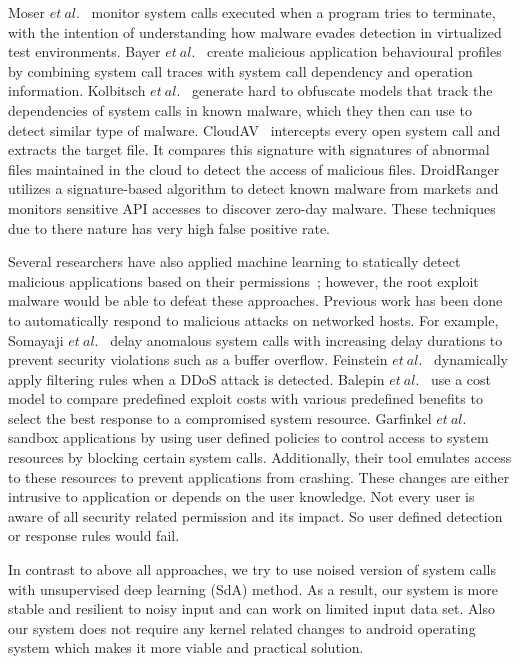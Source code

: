 Moser \(et\ al.\)~\cite{46} monitor system calls executed when a program tries to terminate, with the intention of understanding how malware evades detection in virtualized test environments. Bayer \(et\ al.\)~\cite{47} create malicious application behavioural profiles by combining system call traces with system call dependency and operation information. Kolbitsch \(et\ al.\)~\cite{48} generate hard to obfuscate models that track the dependencies of system calls in known malware, which they then can use to detect similar type of malware. CloudAV~\cite{49} intercepts every open system call and extracts the target file. It compares this signature with signatures of abnormal files maintained in the cloud to detect the access of malicious files. DroidRanger~\cite{50} utilizes a signature-based algorithm to detect known malware from markets and monitors sensitive API accesses to discover zero-day malware. These techniques due to there nature has very high false positive rate.

Several researchers have also applied machine learning to statically detect malicious applications based on their permissions~\cite{50,46,19}; however, the root exploit malware would be able to defeat these approaches. Previous work has been done to automatically respond to malicious attacks on networked hosts. For example, Somayaji \(et\ al.\)~\cite{51} delay anomalous system calls with increasing delay durations to prevent security violations such as a buffer overflow. Feinstein \(et\ al.\)~\cite{52} dynamically apply filtering rules when a DDoS attack is detected. Balepin \(et\ al.\)~\cite{53} use a cost model to compare predefined exploit costs with various predefined benefits to select the best response to a compromised system resource. Garfinkel \(et\ al.\)~\cite{41} sandbox applications by using user defined policies to control access to system resources by blocking certain system calls. Additionally, their tool emulates access to these resources to prevent applications from crashing. These changes are either intrusive to application or depends on the user knowledge. Not every user is aware of all security related permission and its impact. So user defined detection or response rules would fail.

	In contrast to above all approaches, we try to use noised version of system calls with unsupervised deep learning (SdA) method. As a result, our system is more stable and resilient to noisy input and can work on limited input data set. Also our system does not require any kernel related changes to android operating system which makes it more viable and practical solution.